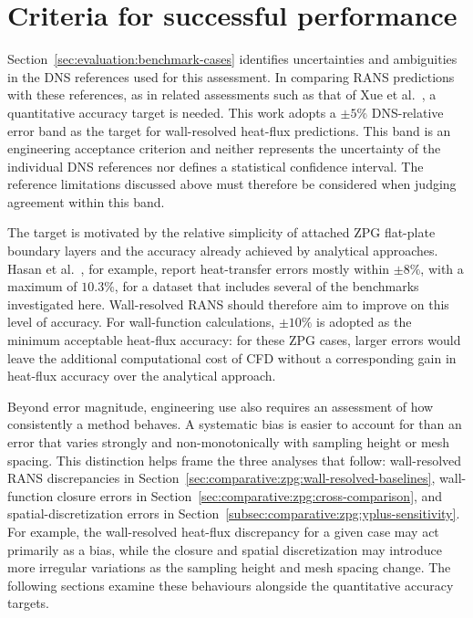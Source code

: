 \section{Criteria for successful performance}
\label{sec:evaluation:success-criteria}

Section~\ref{sec:evaluation:benchmark-cases} identifies uncertainties and ambiguities in the DNS references used for this assessment. In comparing RANS predictions with these references, as in related assessments such as that of Xue et al.~\cite{xue2024assessment}, a quantitative accuracy target is needed. This work adopts a \(\pm5\%\) DNS-relative error band as the target for wall-resolved heat-flux predictions. This band is an engineering acceptance criterion and neither represents the uncertainty of the individual DNS references nor defines a statistical confidence interval. The reference limitations discussed above must therefore be considered when judging agreement within this band.
\par\medskip

The target is motivated by the relative simplicity of attached ZPG flat-plate boundary layers and the accuracy already achieved by analytical approaches. Hasan et al.~\cite[Figure~2]{manzoor2024estimating}, for example, report heat-transfer errors mostly within \(\pm8\%\), with a maximum of \(10.3\%\), for a dataset that includes several of the benchmarks investigated here. Wall-resolved RANS should therefore aim to improve on this level of accuracy. For wall-function calculations, \(\pm10\%\) is adopted as the minimum acceptable heat-flux accuracy: for these ZPG cases, larger errors would leave the additional computational cost of CFD without a corresponding gain in heat-flux accuracy over the analytical approach.
\par\medskip

Beyond error magnitude, engineering use also requires an assessment of how consistently a method behaves. A systematic bias is easier to account for than an error that varies strongly and non-monotonically with sampling height or mesh spacing. This distinction helps frame the three analyses that follow: wall-resolved RANS discrepancies in Section~\ref{sec:comparative:zpg:wall-resolved-baselines}, wall-function closure errors in Section~\ref{sec:comparative:zpg:cross-comparison}, and spatial-discretization errors in Section~\ref{subsec:comparative:zpg:yplus-sensitivity}. For example, the wall-resolved heat-flux discrepancy for a given case may act primarily as a bias, while the closure and spatial discretization may introduce more irregular variations as the sampling height and mesh spacing change. The following sections examine these behaviours alongside the quantitative accuracy targets.

